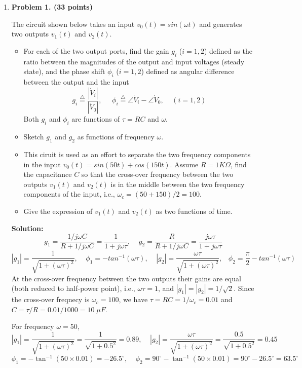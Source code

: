 \begin{enumerate}

\item {\bf Problem 1. (33 points)} 

The circuit shown below takes an input $v_0(t)=sin(\omega t)$ and generates 
two outputs $v_1(t)$ and $v_2(t)$. 


\begin{itemize}
\item For each of the two output ports, find the gain $g_i$ ($i=1,2$) 
defined as the ratio between the magnitudes of the output and input 
voltages (steady state), and the phase shift $\phi_i$ ($i=1,2$) defined
as angular difference between the output and the input
\[ g_i\stackrel{\triangle}{=}\frac{|\dot{V}_i|}{|\dot{V}_0|},\;\;\;\;\;
\phi_i\stackrel{\triangle}{=}\angle \dot{V}_i-\angle \dot{V}_0,\;\;\;\;
(i=1,2) \]
Both $g_i$ and $\phi_i$ are functions of $\tau=RC$ and $\omega$.

\item Sketch $g_1$ and $g_2$ as functions of frequency $\omega$.

\item This ciruit is used as an effort to separate the two frequency components 
in the input $v_0(t)=sin(50 t)+cos(150 t)$. Assume $R=1K\Omega$, find the 
capacitance $C$ so that the cross-over frequency between the two outputs 
$v_1(t)$ and $v_2(t)$ is in the middle between the two frequency components
of the input, i.e., $\omega_c=(50+150)/2=100$.

\item Give the expression of $v_1(t)$ and $v_2(t)$ as two functions of time.

\end{itemize}

{\bf Solution:} 
\[	g_1=\frac{1/j\omega C}{R+1/j\omega C}=\frac{1}{1+j\omega \tau},\;\;\;\;
g_2=\frac{R}{R+1/j\omega C}=\frac{j\omega \tau}{1+j\omega \tau} \]
\[	|g_1|=\frac{1}{\sqrt{1+(\omega \tau)^2}},\;\;\;\;
	\phi_1=-tan^{-1}(\omega \tau),\;\;\;\;
	|g_2|=\frac{\omega \tau}{\sqrt{1+(\omega \tau)^2}},\;\;\;
	\phi_2=\frac{\pi}{2}-tan^{-1}(\omega \tau) \]
At the cross-over frequency between the two outputs their gains are equal 
(both reduced to half-power point), i.e., $\omega \tau=1$, and 
$|g_1|=|g_2|=1/\sqrt{2}$. Since the cross-over freqnecy is $\omega_c=100$,
we have $\tau=RC=1/\omega_c=0.01$ and $C=\tau/R=0.01/1000=10\;\mu F$.

For frequency $\omega=50$, 
\[ |g_1|=\frac{1}{\sqrt{1+(\omega \tau)^2}}=\frac{1}{\sqrt{1+0.5^2}}=0.89,\;\;\;\;
|g_2|=\frac{\omega \tau}{\sqrt{1+(\omega \tau)^2}}=\frac{0.5}{\sqrt{1+0.5^2}}=0.45 \]
\[ \phi_1=-\tan^{-1}(50\times 0.01)=-26.5^\circ,\;\;\;\;
   \phi_2=90^\circ-\tan^{-1}(50\times 0.01)=90^\circ-26.5^\circ=63.5^\circ \]


\end{enumerate}
